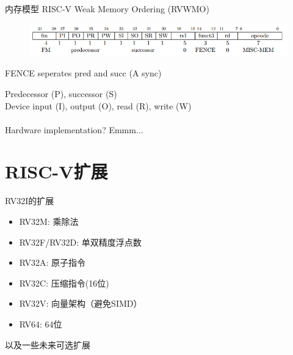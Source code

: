 \documentclass[UTF8]{ctexbeamer}
\begin{document}
\begin{frame}{内存模型}
RISC-V Weak Memory Ordering (RVWMO)
\begin{figure}
\centering
\includegraphics[width=\linewidth]{fig/Lecture2/misc-mem.PNG}
\end{figure}
\begin{center}
FENCE seperates pred and succ (A sync)
\end{center}
Predecessor (P), successor (S)\\
Device input (I), output (O), read (R), write (W)\\
\quad\\
Hardware implementation? Emmm...
\end{frame}


\section{RISC-V扩展}
\begin{frame}
\sectionpage
\end{frame}

\begin{frame}{RV32I的扩展}
\begin{itemize}
	\item RV32M: 乘除法
	\item RV32F/RV32D: 单双精度浮点数
	\item RV32A: 原子指令
	\item RV32C: 压缩指令(16位)
	\item RV32V: 向量架构（避免SIMD）
	\item RV64: 64位
\end{itemize}
以及一些未来可选扩展
\end{frame}
\end{document}

